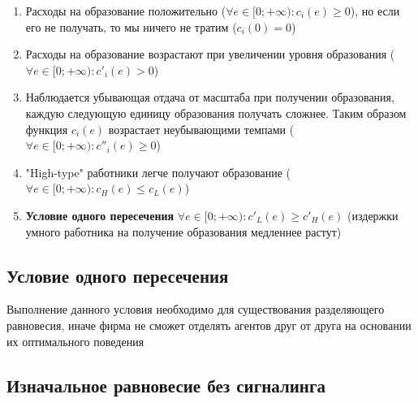 \begin{enumerate}
    \item Расходы на образование положительно ($\forall e\in [0;+\infty) : c_i(e)\geq0$), но если его не получать, то мы ничего не тратим ($c_i(0)=0$)
    \item Расходы на образование возрастают при увеличении уровня образования ($\forall e\in [0;+\infty) : c'_i(e)>0$)
    \item Наблюдается убывающая отдача от масштаба при получении образования, каждую следующую единицу образования
    получать сложнее. Таким образом функция $c_i(e)$ возрастает неубывающими темпами ($\forall e\in [0;+\infty) : c''_i(e)\geq0$)
    \item "High-type" работники легче получают образование ($\forall e\in [0;+\infty) : c_H(e)\leq c_L(e)$)
    \item \textbf{Условие одного пересечения} $\forall e\in [0;+\infty) : c'_L(e)\geq c'_H(e)$ (издержки умного
    работника на получение образования медленнее растут)
\end{enumerate}

\subsection{Условие одного пересечения}

\indent\setlength{\parindent}{1em}Выполнение данного условия необходимо для существования разделяющего равновесия,
иначе фирма не сможет отделять агентов друг от друга на основании их оптимального поведения\smallskip

\begin{center}
\end{center}

\subsection{Изначальное равновесие без сигналинга}

